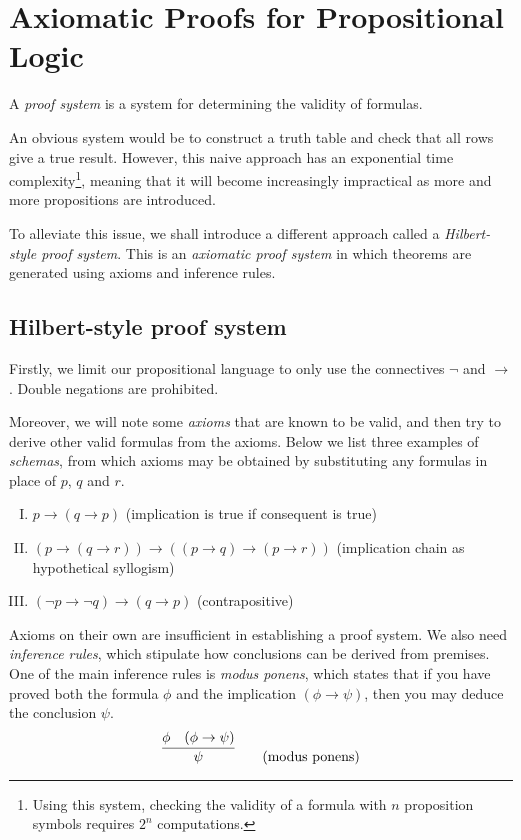 \section{Axiomatic Proofs for Propositional Logic}

A \emph{proof system} is a system for determining the validity of formulas.

An obvious system would be to construct a truth table and check that all rows give a true result. However, this naive approach has an exponential time complexity\footnote{Using this system, checking the validity of a formula with \(n\) proposition symbols requires \(2^n\) computations.}, meaning that it will become increasingly impractical as more and more propositions are introduced.

To alleviate this issue, we shall introduce a different approach called a \emph{Hilbert-style proof system}. This is an \emph{axiomatic proof system} in which theorems are generated using axioms and inference rules.



\subsection{Hilbert-style proof system}

Firstly, we limit our propositional language to only use the connectives \(\neg\) and \(\rightarrow\). Double negations are prohibited.

Moreover, we will note some \emph{axioms} that are known to be valid, and then try to derive other valid formulas from the axioms. Below we list three examples of \emph{schemas}, from which axioms may be obtained by substituting any formulas in place of \(p\), \(q\) and \(r\).
%
\begin{enumerate}[I.]
    \item \(p \rightarrow (q \rightarrow p)\)
    \hfill (implication is true if consequent is true)
    \label{axiom-I}
    
    \item \((p \rightarrow (q \rightarrow r)) \rightarrow ((p \rightarrow q) \rightarrow (p \rightarrow r))\)
    \hfill (implication chain as hypothetical syllogism)
    \label{axiom-II}
    
    \item \((\neg p \rightarrow \neg q) \rightarrow (q \rightarrow p)\)
    \hfill (contrapositive)
    \label{axiom-III}
\end{enumerate}

Axioms on their own are insufficient in establishing a proof system. We also need \emph{inference rules}, which stipulate how conclusions can be derived from premises. One of the main inference rules is \emph{modus ponens}, which states that if you have proved both the formula \(\phi\) and the implication \((\phi\rightarrow\psi)\), then you may deduce the conclusion \(\psi\).
%
\[
    \infer{\psi}{
        \phi
        &
        (\phi\rightarrow\psi)
    }
    \tag{modus ponens}
\]


